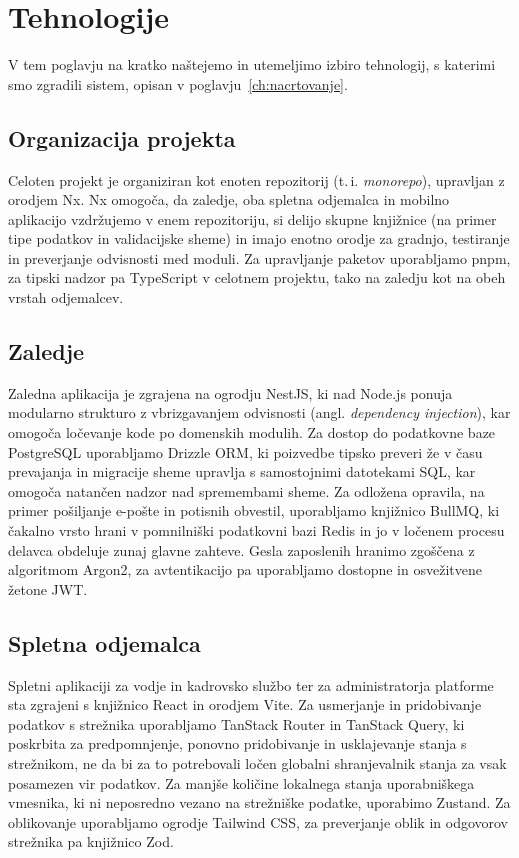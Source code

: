 \chapter{Tehnologije}
\label{ch:tehnologije}

V tem poglavju na kratko naštejemo in utemeljimo izbiro tehnologij, s katerimi smo zgradili sistem, opisan v poglavju~\ref{ch:nacrtovanje}.

\section{Organizacija projekta}

Celoten projekt je organiziran kot enoten repozitorij (t.\,i. \textit{monorepo}), upravljan z orodjem Nx. Nx omogoča, da zaledje, oba spletna odjemalca in mobilno aplikacijo vzdržujemo v enem repozitoriju, si delijo skupne knjižnice (na primer tipe podatkov in validacijske sheme) in imajo enotno orodje za gradnjo, testiranje in preverjanje odvisnosti med moduli. Za upravljanje paketov uporabljamo pnpm, za tipski nadzor pa TypeScript v celotnem projektu, tako na zaledju kot na obeh vrstah odjemalcev.

\section{Zaledje}

Zaledna aplikacija je zgrajena na ogrodju NestJS, ki nad Node.js ponuja modularno strukturo z vbrizgavanjem odvisnosti (angl. \textit{dependency injection}), kar omogoča ločevanje kode po domenskih modulih. Za dostop do podatkovne baze PostgreSQL uporabljamo Drizzle ORM, ki poizvedbe tipsko preveri že v času prevajanja in migracije sheme upravlja s samostojnimi datotekami SQL, kar omogoča natančen nadzor nad spremembami sheme. Za odložena opravila, na primer pošiljanje e-pošte in potisnih obvestil, uporabljamo knjižnico BullMQ, ki čakalno vrsto hrani v pomnilniški podatkovni bazi Redis in jo v ločenem procesu delavca obdeluje zunaj glavne zahteve. Gesla zaposlenih hranimo zgoščena z algoritmom Argon2, za avtentikacijo pa uporabljamo dostopne in osvežitvene žetone JWT.

\section{Spletna odjemalca}

Spletni aplikaciji za vodje in kadrovsko službo ter za administratorja platforme sta zgrajeni s knjižnico React in orodjem Vite. Za usmerjanje in pridobivanje podatkov s strežnika uporabljamo TanStack Router in TanStack Query, ki poskrbita za predpomnjenje, ponovno pridobivanje in usklajevanje stanja s strežnikom, ne da bi za to potrebovali ločen globalni shranjevalnik stanja za vsak posamezen vir podatkov. Za manjše količine lokalnega stanja uporabniškega vmesnika, ki ni neposredno vezano na strežniške podatke, uporabimo Zustand. Za oblikovanje uporabljamo ogrodje Tailwind CSS, za preverjanje oblik in odgovorov strežnika pa knjižnico Zod.

